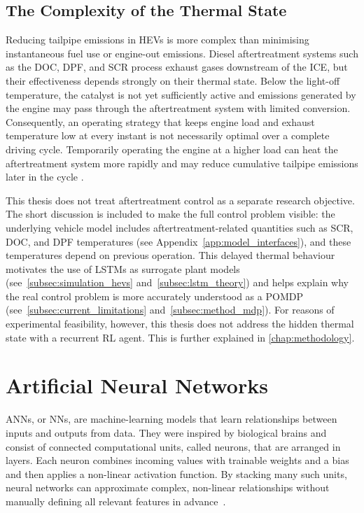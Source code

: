 \subsection{The Complexity of the Thermal State}
\label{subsec:thermal_state_complexity}
Reducing tailpipe emissions in \acp{HEV} is more complex than minimising instantaneous fuel use or engine-out emissions. Diesel aftertreatment systems such as the \ac{DOC}, \ac{DPF}, and \ac{SCR} process exhaust gases downstream of the \ac{ICE}, but their effectiveness depends strongly on their thermal state. Below the light-off temperature, the catalyst is not yet sufficiently active and emissions generated by the engine may pass through the aftertreatment system with limited conversion. Consequently, an operating strategy that keeps engine load and exhaust temperature low at every instant is not necessarily optimal over a complete driving cycle. Temporarily operating the engine at a higher load can heat the aftertreatment system more rapidly and may reduce cumulative tailpipe emissions later in the cycle \cite{hofmann_hybridfahrzeuge_2023}.

This thesis does not treat aftertreatment control as a separate research objective. The short discussion is included to make the full control problem visible: the underlying vehicle model includes aftertreatment-related quantities such as \ac{SCR}, \ac{DOC}, and \ac{DPF} temperatures (see Appendix~\ref{app:model_interfaces}), and these temperatures depend on previous operation. This delayed thermal behaviour motivates the use of \acp{LSTM} as surrogate plant models (see~\autoref{subsec:simulation_hevs} and~\autoref{subsec:lstm_theory}) and helps explain why the real control problem is more accurately understood as a \ac{POMDP} (see~\autoref{subsec:current_limitations} and~\autoref{subsec:method_mdp}). For reasons of experimental feasibility, however, this thesis does not address the hidden thermal state with a recurrent \ac{RL} agent. This is further explained in \autoref{chap:methodology}.

\section{Artificial Neural Networks}
\label{sec:anns}
\ac{ANN}s, or \ac{NN}s, are machine-learning models that learn relationships between inputs and outputs from data. They were inspired by biological brains and consist of connected computational units, called neurons, that are arranged in layers. Each neuron combines incoming values with trainable weights and a bias and then applies a non-linear activation function. By stacking many such units, neural networks can approximate complex, non-linear relationships without manually defining all relevant features in advance~\cite{goodfellow_deep_2016}.

